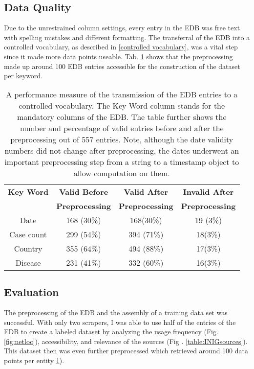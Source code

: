 \subsection{Data Quality}
  Due to the unrestrained column settings, every entry in the EDB was free text with spelling mistakes and different formatting.
  The transferral of the EDB into a controlled vocabulary, as described in \ref{controlled vocabulary}, was a vital step since it made more data points useable.
  Tab. \ref{table:preprocessing performance} shows that the preprocessing made up around 100 EDB entries accessible for the construction of the dataset per keyword.

  \begin{table}
    \centering
    \caption{A performance measure of the transmission of the EDB entries to a controlled vocabulary. The Key Word column stands for the mandatory columns of the EDB. The table further shows the number and percentage of valid entries before and after the preprocessing out of 557 entries. Note, although the date validity numbers did not change after preprocessing, the dates underwent an important preprocessing step from a string to a timestamp object to allow computation on them.}
    \begin{tabular}{@{}cccc@{}}
      \toprule
      \textbf{Key Word} & \textbf{Valid Before} & \textbf{Valid After} & \textbf{Invalid After} \\
      & \textbf{Preprocessing} & \textbf{Preprocessing} & \textbf{Preprocessing} \\
      \midrule
      Date& 168 (30\%)& 168(30\%)&  19 (3\%) \\
      Case count& 299 (54\%)& 394 (71\%)&  18(3\%) \\
      Country& 355 (64\%)& 494 (88\%)&  17(3\%) \\
      Disease& 231 (41\%)& 332 (60\%)& 16(3\%) \\
      \bottomrule
    \end{tabular}
  \label{table:preprocessing performance}
  \end{table}

\subsection{Evaluation}
  The preprocessing of the EDB and the assembly of a training data set was successful.
  With only two scrapers, I was able to use half of the entries of the EDB to create a labeled dataset by analyzing the usage frequency (Fig. \ref{fig:netloc}), accessibility, and relevance of the sources (Fig . \ref{table:INIGsources}).
  This dataset then was even further preprocessed which retrieved around 100 data points per entity \ref{table:preprocessing performance}).

